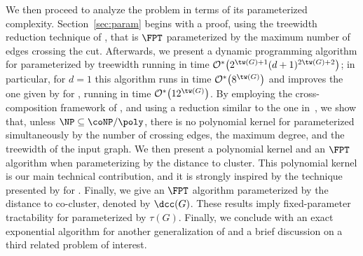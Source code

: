 We then proceed to analyze the problem in terms of its parameterized complexity.
Section~\ref{sec:param} begins with a proof, using the treewidth reduction technique of \citep{marx_treewidth_reduction}, that  is $\FPT$ parameterized by the maximum number of edges crossing the cut.
Afterwards, we present a dynamic programming algorithm for  parameterized by treewidth running in time $\bigOs{2^{\tw(G)+1}(d+1)^{2\tw(G) + 2}}$; in particular, for $d=1$ this algorithm runs in time $\bigOs{8^{\tw(G)}}$ and improves the one given by \cite{matching_cut_structural} for , running in time  $\bigOs{12^{\tw(G)}}$.
By employing the cross-composition framework of \cite{cross_composition}, and using a reduction similar to the one in~\citep{matching_cut_ipec}, we show that, unless $\NP \subseteq \coNP/\poly$, there is no polynomial kernel for  parameterized simultaneously by the number of crossing edges, the maximum degree, and the treewidth of the input graph.
We then present a polynomial kernel and an $\FPT$ algorithm when parameterizing by the distance to cluster.
This polynomial kernel is our main technical contribution, and it is strongly inspired by the technique presented by \cite{matching_cut_ipec} for . Finally, we give an $\FPT$ algorithm parameterized by the distance to co-cluster, denoted by $\dcc(G)$.
These results imply fixed-parameter tractability for  parameterized by $\tau(G)$.
Finally, we conclude with an exact exponential algorithm for another generalization of  and a brief discussion on a third related problem of interest.





%